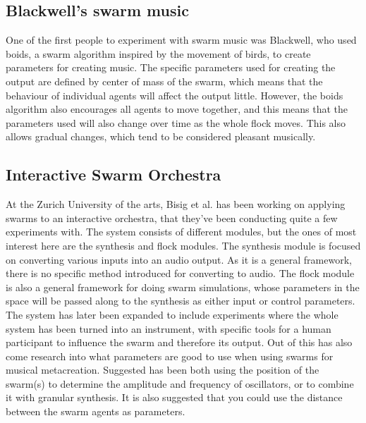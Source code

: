 \documentclass[a4paper,english]{report}
\begin{document}
	\subsection{Blackwell's swarm music}
	One of the first people to experiment with swarm music was Blackwell, who used boids, a swarm algorithm inspired by the movement of birds, to create parameters for creating music\cite{blackwell2003swarm}. The specific parameters used for creating the output are defined by center of mass of the swarm, which means that the behaviour of individual agents will affect the output little. However, the boids algorithm also encourages all agents to move together, and this means that the parameters used will also change over time as the whole flock moves. This also allows gradual changes, which tend to be considered pleasant musically.
	\subsection{Interactive Swarm Orchestra}
	At the Zurich University of the arts, Bisig et al. has been working on applying swarms to an interactive orchestra, that they've been conducting quite a few experiments with. The system consists of different modules, but the ones of most interest here are the synthesis and flock modules. The synthesis module is focused on converting various inputs into an audio output. As it is a general framework, there is no specific method introduced for converting to audio. The flock module is also a general framework for doing swarm simulations, whose parameters in the space will be passed along to the synthesis as either input or control parameters.\\
	The system has later been expanded to include experiments where the whole system has been turned into an instrument, with specific tools for a human participant to influence the swarm and therefore its output. Out of this has also come research into what parameters are good to use when using swarms for musical metacreation. Suggested has been both using the position of the swarm(s) to determine the amplitude and frequency of oscillators, or to combine it with granular synthesis. It is also suggested that you could use the distance between the swarm agents as parameters. 
\end{document}
